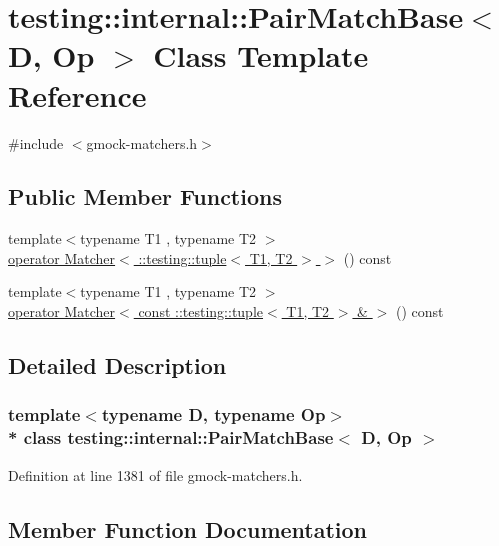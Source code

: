 \hypertarget{classtesting_1_1internal_1_1_pair_match_base}{}\section{testing\+:\+:internal\+:\+:Pair\+Match\+Base$<$ D, Op $>$ Class Template Reference}
\label{classtesting_1_1internal_1_1_pair_match_base}


{\ttfamily \#include $<$gmock-\/matchers.\+h$>$}

\subsection*{Public Member Functions}
\begin{DoxyCompactItemize}
\item 
{\footnotesize template$<$typename T1 , typename T2 $>$ }\\\hyperlink{classtesting_1_1internal_1_1_pair_match_base_a8f927cfe9008f7c35dcb03275bc69762}{operator Matcher$<$ \+::testing\+::tuple$<$ T1, T2 $>$ $>$} () const 
\item 
{\footnotesize template$<$typename T1 , typename T2 $>$ }\\\hyperlink{classtesting_1_1internal_1_1_pair_match_base_a51667d1fc49779ceff1bbf334bfe0470}{operator Matcher$<$ const \+::testing\+::tuple$<$ T1, T2 $>$ \& $>$} () const 
\end{DoxyCompactItemize}


\subsection{Detailed Description}
\subsubsection*{template$<$typename D, typename Op$>$\\*
class testing\+::internal\+::\+Pair\+Match\+Base$<$ D, Op $>$}



Definition at line 1381 of file gmock-\/matchers.\+h.



\subsection{Member Function Documentation}
